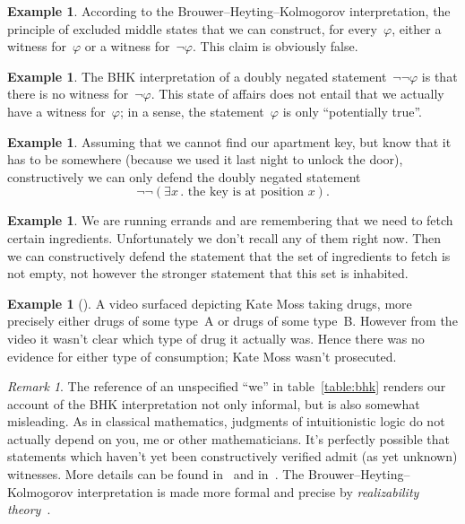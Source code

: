 \documentclass[10pt,reqno,a4paper,openany]{amsbook}
\theoremstyle{definition}
\newtheorem{ex}[defn]{Example}
\theoremstyle{plain}
\theoremstyle{remark}
\newtheorem{rem}[defn]{Remark}
\newcommand{\?}{\,{:}\,}
\renewcommand{\_}{\mathpunct{.}\,}
\begin{document}
\begin{ex}
According to the Brouwer--Heyting--Kolmogorov interpretation, the principle of
excluded middle states that we can construct, for every~$\varphi$,
either a witness for~$\varphi$ or a witness for~$\neg\varphi$. This claim is
obviously false.
\end{ex}

\begin{ex}
The BHK interpretation of a doubly negated statement~$\neg\neg\varphi$ is that
there is no witness for~$\neg\varphi$. This state of affairs does not entail
that we actually have a witness for~$\varphi$; in a sense, the
statement~$\varphi$ is only ``potentially true''.
\end{ex}

\begin{ex}\label{ex:key}
Assuming that we cannot find our apartment key, but know that it has to be
somewhere (because we used it last night to unlock the door), constructively we
can only defend the doubly negated statement
\[ \neg\neg (\exists x\_ \text{the key is at position~$x$}). \]
\end{ex}

\begin{ex}
We are running errands and are remembering that we need to fetch certain
ingredients. Unfortunately we don't recall any of them right now. Then we can
constructively defend the statement that the set of ingredients to fetch is not
empty, not however the stronger statement that this set is inhabited.
\end{ex}

\begin{ex}[\cite{sigfpe:katemoss,bbc:katemoss}]
A video surfaced depicting Kate Moss taking drugs, more precisely either drugs
of some type~A or drugs of some type~B. However from the video it wasn't clear
which type of drug it actually was. Hence there was no evidence for either type
of consumption; Kate Moss wasn't prosecuted.
\end{ex}

\begin{rem}The reference of an unspecified ``we'' in table~\ref{table:bhk}
renders our account of the BHK interpretation not only informal, but is also
somewhat misleading. As in classical mathematics, judgments of intuitionistic
logic do not actually depend on you, me or other mathematicians. It's perfectly
possible that statements which haven't yet been constructively verified admit
(as yet unknown) witnesses. More details can be found
in~\cite[pp.~42]{kohlenbach:applprooftheory} and
in~\cite{artemov:bhk,sanz-piecha:critical-bhk,dalen:bhk}. The
Brouwer--Heyting--Kolmogorov interpretation is made more formal and precise by
\emph{realizability theory}~\cite{bauer:realizability,oosten:realizability}.
\end{rem}
\end{document}

